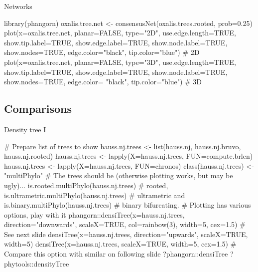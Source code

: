 \documentclass[compress, xelatex, 11pt, xcolor=svgnames, aspectratio=169,
	hyperref={
		bookmarks=true,
		unicode=true,
		colorlinks=true,
		pdftitle={Molecular data in R},
		plainpages=false,
		pdfauthor={Vojtech Zeisek},
		pdfsubject={Course about phylogeny and evolution in R},
		pdfcreator={XeLaTeX},
		pdfkeywords={R, evolution, phylogeny, molecular data},
		linkcolor=Crimson, %
		anchorcolor=Magenta, %
		citecolor=Magenta, %
		filecolor=Magenta, %
		menucolor=Magenta, %
		urlcolor=DodgerBlue, %
		},
	url={hyphens, lowtilde} %
	]{beamer}
\renewcommand{\texttt}[1]{\colorbox{Beige}{{\ttfamily #1}}}
\begin{document}
%

\begin{frame}[fragile]{Networks}
	\begin{spluscode}
    library(phangorn)
    oxalis.tree.net <- consensusNet(oxalis.trees.rooted, prob=0.25)
    plot(x=oxalis.tree.net, planar=FALSE, type="2D", use.edge.length=TRUE,
      show.tip.label=TRUE, show.edge.label=TRUE, show.node.label=TRUE,
      show.nodes=TRUE, edge.color="black", tip.color="blue") # 2D
    plot(x=oxalis.tree.net, planar=FALSE, type="3D", use.edge.length=TRUE,
      show.tip.label=TRUE, show.edge.label=TRUE, show.node.label=TRUE,
      show.nodes=TRUE, edge.color= "black", tip.color="blue") # 3D
	\end{spluscode}
	\begin{center}
		\texttt{[image: oxalis-net.png]}
	\end{center}
\end{frame}

\subsection{Comparisons}

\begin{frame}[fragile]{Density tree I}
	\begin{spluscode}
    # Prepare list of trees to show
    hauss.nj.trees <- list(hauss.nj, hauss.nj.bruvo, hauss.nj.rooted)
    hauss.nj.trees <- lapply(X=hauss.nj.trees, FUN=compute.brlen)
    hauss.nj.trees <- lapply(X=hauss.nj.trees, FUN=chronos)
    class(hauss.nj.trees) <- "multiPhylo"
    # The trees should be (otherwise plotting works, but may be ugly)...
    is.rooted.multiPhylo(hauss.nj.trees) # rooted,
    is.ultrametric.multiPhylo(hauss.nj.trees) # ultrametric and
    is.binary.multiPhylo(hauss.nj.trees) # binary bifurcating.
    # Plotting has various options, play with it
    phangorn::densiTree(x=hauss.nj.trees, direction="downwards",
      scaleX=TRUE, col=rainbow(3), width=5, cex=1.5) # See next slide
    densiTree(x=hauss.nj.trees, direction="upwards", scaleX=TRUE, width=5)
    densiTree(x=hauss.nj.trees, scaleX=TRUE, width=5, cex=1.5)
    # Compare this option with similar on following slide
    ?phangorn::densiTree
    ?phytools::densityTree
	\end{spluscode}
\end{frame}
\end{document}
